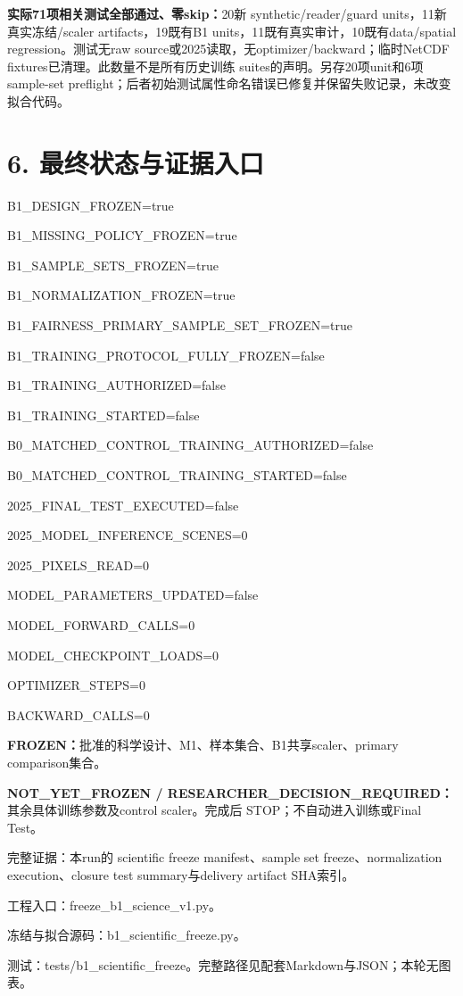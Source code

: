 \documentclass[11pt,a4paper,fontset=windows]{ctexart}
\begin{document}
\textbf{实际71项相关测试全部通过、零skip：}20新 synthetic/reader/guard units，11新真实冻结/scaler artifacts，19既有B1 units，11既有真实审计，10既有data/spatial regression。测试无raw source或2025读取，无optimizer/backward；临时NetCDF fixtures已清理。此数量不是所有历史训练 suites的声明。另存20项unit和6项sample-set preflight；后者初始测试属性命名错误已修复并保留失败记录，未改变拟合代码。
\newpage
\section*{6. 最终状态与证据入口}
{\small\ttfamily\setlength{\parskip}{1.5pt}
B1\_DESIGN\_FROZEN=true\par
B1\_MISSING\_POLICY\_FROZEN=true\par
B1\_SAMPLE\_SETS\_FROZEN=true\par
B1\_NORMALIZATION\_FROZEN=true\par
B1\_FAIRNESS\_PRIMARY\_SAMPLE\_SET\_FROZEN=true\par
B1\_TRAINING\_PROTOCOL\_FULLY\_FROZEN=false\par
B1\_TRAINING\_AUTHORIZED=false\par
B1\_TRAINING\_STARTED=false\par
B0\_MATCHED\_CONTROL\_TRAINING\_AUTHORIZED=false\par
B0\_MATCHED\_CONTROL\_TRAINING\_STARTED=false\par
2025\_FINAL\_TEST\_EXECUTED=false\par
2025\_MODEL\_INFERENCE\_SCENES=0\par
2025\_PIXELS\_READ=0\par
MODEL\_PARAMETERS\_UPDATED=false\par
MODEL\_FORWARD\_CALLS=0\par
MODEL\_CHECKPOINT\_LOADS=0\par
OPTIMIZER\_STEPS=0\par BACKWARD\_CALLS=0\par}

\textbf{FROZEN：}批准的科学设计、M1、样本集合、B1共享scaler、primary comparison集合。

\textbf{NOT\_YET\_FROZEN / RESEARCHER\_DECISION\_REQUIRED：}其余具体训练参数及control scaler。完成后 STOP；不自动进入训练或Final Test。

完整证据：本run的 scientific freeze manifest、sample set freeze、normalization execution、closure test summary与delivery artifact SHA索引。\par
工程入口：freeze\_b1\_science\_v1.py。\par
冻结与拟合源码：b1\_scientific\_freeze.py。\par
测试：tests/b1\_scientific\_freeze。完整路径见配套Markdown与JSON；本轮无图表。
\end{document}
